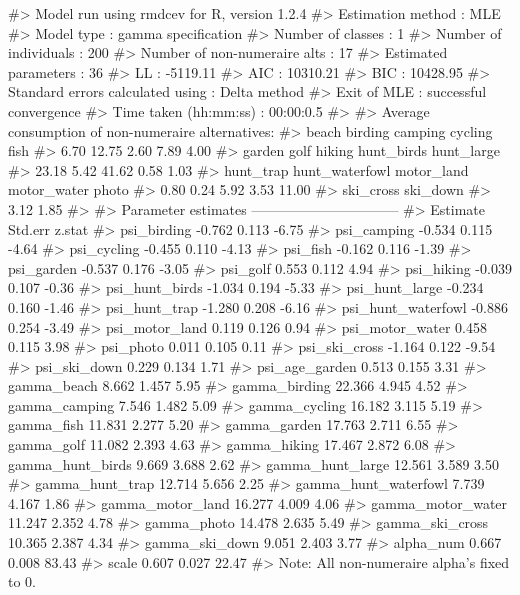 \begin{example}
#> Model run using rmdcev for R, version 1.2.4 
#> Estimation method                : MLE
#> Model type                       : gamma specification
#> Number of classes                : 1
#> Number of individuals            : 200
#> Number of non-numeraire alts     : 17
#> Estimated parameters             : 36
#> LL                               : -5119.11
#> AIC                              : 10310.21
#> BIC                              : 10428.95
#> Standard errors calculated using : Delta method
#> Exit of MLE                      : successful convergence
#> Time taken (hh:mm:ss)            : 00:00:0.5
#> 
#> Average consumption of non-numeraire alternatives:
#>          beach        birding        camping        cycling           fish 
#>           6.70          12.75           2.60           7.89           4.00 
#>         garden           golf         hiking     hunt_birds     hunt_large 
#>          23.18           5.42          41.62           0.58           1.03 
#>      hunt_trap hunt_waterfowl     motor_land    motor_water          photo 
#>           0.80           0.24           5.92           3.53          11.00 
#>      ski_cross       ski_down 
#>           3.12           1.85 
#> 
#> Parameter estimates --------------------------------  
#>                      Estimate Std.err z.stat
#> psi_birding            -0.762   0.113  -6.75
#> psi_camping            -0.534   0.115  -4.64
#> psi_cycling            -0.455   0.110  -4.13
#> psi_fish               -0.162   0.116  -1.39
#> psi_garden             -0.537   0.176  -3.05
#> psi_golf                0.553   0.112   4.94
#> psi_hiking             -0.039   0.107  -0.36
#> psi_hunt_birds         -1.034   0.194  -5.33
#> psi_hunt_large         -0.234   0.160  -1.46
#> psi_hunt_trap          -1.280   0.208  -6.16
#> psi_hunt_waterfowl     -0.886   0.254  -3.49
#> psi_motor_land          0.119   0.126   0.94
#> psi_motor_water         0.458   0.115   3.98
#> psi_photo               0.011   0.105   0.11
#> psi_ski_cross          -1.164   0.122  -9.54
#> psi_ski_down            0.229   0.134   1.71
#> psi_age_garden          0.513   0.155   3.31
#> gamma_beach             8.662   1.457   5.95
#> gamma_birding          22.366   4.945   4.52
#> gamma_camping           7.546   1.482   5.09
#> gamma_cycling          16.182   3.115   5.19
#> gamma_fish             11.831   2.277   5.20
#> gamma_garden           17.763   2.711   6.55
#> gamma_golf             11.082   2.393   4.63
#> gamma_hiking           17.467   2.872   6.08
#> gamma_hunt_birds        9.669   3.688   2.62
#> gamma_hunt_large       12.561   3.589   3.50
#> gamma_hunt_trap        12.714   5.656   2.25
#> gamma_hunt_waterfowl    7.739   4.167   1.86
#> gamma_motor_land       16.277   4.009   4.06
#> gamma_motor_water      11.247   2.352   4.78
#> gamma_photo            14.478   2.635   5.49
#> gamma_ski_cross        10.365   2.387   4.34
#> gamma_ski_down          9.051   2.403   3.77
#> alpha_num               0.667   0.008  83.43
#> scale                   0.607   0.027  22.47
#> Note: All non-numeraire alpha's fixed to 0.
\end{example}

